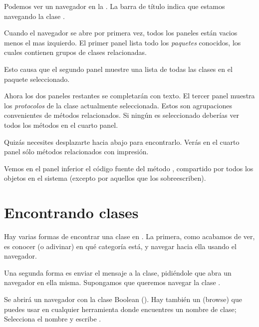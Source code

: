 \documentclass[a4paper,10pt,twoside]{book}
\begin{document}
Podemos ver un navegador en la .
La barra de t\'itulo indica que estamos navegando la clase .

Cuando el navegador se abre por primera vez, todos los paneles est\'an vacios menos el mas izquierdo.
El primer panel lista todo los \emph{paquetes} conocidos, los cuales contienen grupos de clases relacionadas.

Esto causa que el segundo panel muestre una lista de todas las clases en el paquete seleccionado.

Ahora los dos paneles restantes se completar\'an con texto.
El tercer panel muestra los \emph{protocolos} de la clase actualmente seleccionada.
Estos son agrupaciones convenientes de m\'etodos relacionados.
Si ning\'un  es seleccionado deber\'ias ver todos los m\'etodos en el cuarto panel.

Quiz\'as necesites desplazarte hacia abajo para encontrarlo.
Ver\'as en el cuarto panel s\'olo m\'etodos relacionados con impresi\'on.

Vemos en el panel inferior el c\'odigo fuente del m\'etodo , compartido por todos los objetos en el sistema (excepto por aquellos que los sobreescriben).

\section{Encontrando clases}

Hay varias formas de encontrar una clase en \pharo. La primera, como acabamos de ver, es conocer (o adivinar) en qu\'e categor\'ia est\'a, y navegar hacia ella usando el navegador.

Una segunda forma es enviar el mensaje  a la clase, pidi\'endole que abra un navegador en ella misma. Supongamos que queremos navegar la clase .

Se abrir\'a un navegador con la clase Boolean ().
Hay tambi\'en un   (browse) que puedes usar en cualquier herramienta donde encuentres un nombre de clase;
Selecciona el nombre y escribe .
\end{document}
